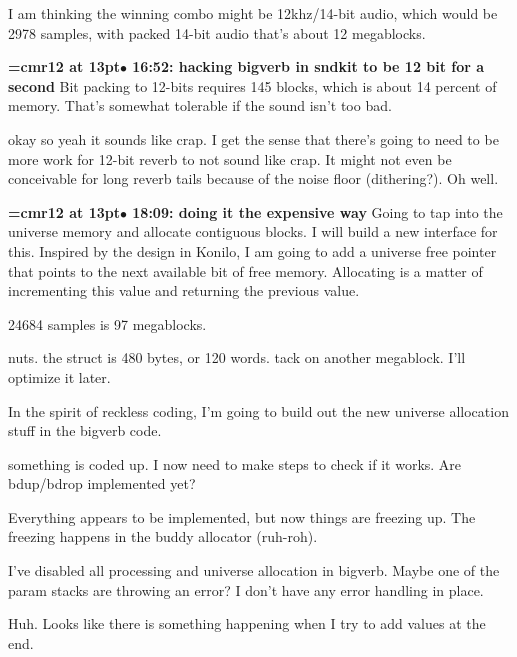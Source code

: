 I am thinking the winning combo might be 12khz/14-bit audio, which would be 2978 samples, with packed 14-bit audio that's about 12 megablocks.
\par

{\smallskip\noindent\bf\font\titlefont=cmr12 at 13pt\titlefont $\bullet$ 16:52: hacking bigverb in sndkit to be 12 bit for a second}\smallskip
Bit packing to 12-bits requires 145 blocks, which is about 14 percent of memory. That's somewhat tolerable if the sound isn't too bad.
\par

okay so yeah it sounds like crap. I get the sense that there's going to need to be more work for 12-bit reverb to not sound like crap. It might not even be conceivable for long reverb tails because of the noise floor (dithering?). Oh well.
\par

{\smallskip\noindent\bf\font\titlefont=cmr12 at 13pt\titlefont $\bullet$ 18:09: doing it the expensive way}\smallskip
Going to tap into the universe memory and allocate contiguous blocks. I will build a new interface for this. Inspired by the design in Konilo, I am going to add a universe free pointer that points to the next available bit of free memory. Allocating is a matter of incrementing this value and returning the previous value.
\par

24684 samples is 97 megablocks.
\par

nuts. the struct is 480 bytes, or 120 words. tack on another megablock. I'll optimize it later.
\par

In the spirit of reckless coding, I'm going to build out the new universe allocation stuff in the bigverb code.
\par

something is coded up. I now need to make steps to check if it works. Are bdup/bdrop implemented yet?
\par

Everything appears to be implemented, but now things are freezing up. The freezing happens in the buddy allocator (ruh-roh).
\par

I've disabled all processing and universe allocation in bigverb. Maybe one of the param stacks are throwing an error? I don't have any error handling in place.
\par

Huh. Looks like there is something happening when I try to add values at the end.
\par

